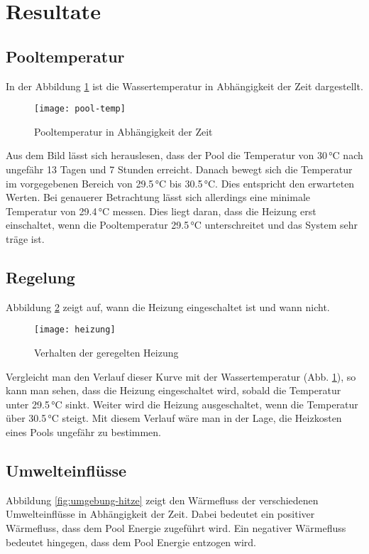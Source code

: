 \section{Resultate}
\label{sec:Resultate}

\subsection{Pooltemperatur}
\label{subsec:Pooltemperatur}
In der Abbildung \ref{fig:pool-temp} ist die Wassertemperatur in Abhängigkeit der Zeit dargestellt.
 
\begin{figure}[H]
	\centering
	\texttt{[image: pool-temp]}
	\caption{Pooltemperatur in Abhängigkeit der Zeit}
	\label{fig:pool-temp}
\end{figure}

Aus dem Bild lässt sich herauslesen, dass der Pool die Temperatur von 30\,°C nach ungefähr 13 Tagen und 7 Stunden erreicht. Danach bewegt sich die Temperatur im vorgegebenen Bereich von 29.5\,°C bis 30.5\,°C. Dies entspricht den erwarteten Werten. Bei genauerer Betrachtung lässt sich allerdings eine minimale Temperatur von 29.4\,°C messen. Dies liegt daran, dass die Heizung erst einschaltet, wenn die Pooltemperatur 29.5\,°C unterschreitet und das System sehr träge ist.

\subsection{Regelung}
\label{subsec:Regelung}
Abbildung \ref{fig:heizung} zeigt auf, wann die Heizung eingeschaltet ist und wann nicht.

\begin{figure}[H]
	\centering
	\texttt{[image: heizung]}
	\caption{Verhalten der geregelten Heizung}
	\label{fig:heizung}
\end{figure}

Vergleicht man den Verlauf dieser Kurve mit der Wassertemperatur (Abb. \ref{fig:pool-temp}), so kann man sehen, dass die Heizung eingeschaltet wird, sobald die Temperatur unter 29.5\,°C sinkt. Weiter wird die Heizung ausgeschaltet, wenn die Temperatur über 30.5\,°C steigt. Mit diesem Verlauf wäre man in der Lage, die Heizkosten eines Pools ungefähr zu bestimmen.

\subsection{Umwelteinflüsse}
\label{subsec:Umwelteinfluesse}
Abbildung \ref{fig:umgebung-hitze} zeigt den Wärmefluss der verschiedenen Umwelteinflüsse in Abhängigkeit der Zeit. Dabei bedeutet ein positiver Wärmefluss, dass dem Pool Energie zugeführt wird. Ein negativer Wärmefluss bedeutet hingegen, dass dem Pool Energie entzogen wird.


